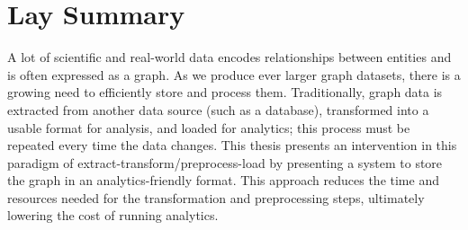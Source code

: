 

\chapter{Lay Summary}

A lot of scientific and real-world data encodes relationships between entities and is often expressed as a graph.
As we produce ever larger graph datasets, there is a growing need to efficiently store and process them.
Traditionally, graph data is extracted from another data source (such as a database), transformed into a usable format for analysis, and loaded for analytics; this process must be repeated every time the data changes.
This thesis presents an intervention in this paradigm of extract-transform\slash{}preprocess-load by presenting a system to store the graph in an analytics-friendly format.
This approach reduces the time and resources needed for the transformation and preprocessing steps, ultimately lowering the cost of running analytics.